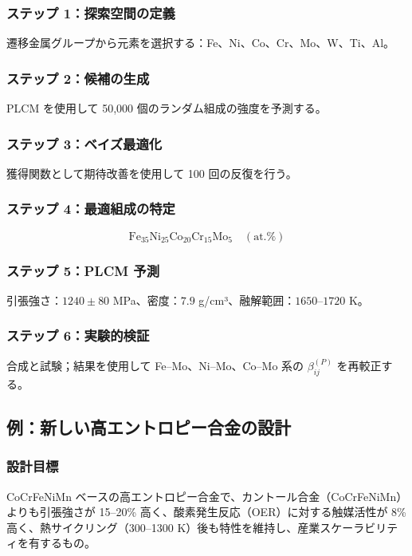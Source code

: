 \documentclass[11pt,a4paper]{article}
\theoremstyle{remark}
\begin{document}
	\subsubsection{ステップ 1：探索空間の定義}
	遷移金属グループから元素を選択する：Fe、Ni、Co、Cr、Mo、W、Ti、Al。
	
	\subsubsection{ステップ 2：候補の生成}
	PLCM を使用して 50,000 個のランダム組成の強度を予測する。
	
	\subsubsection{ステップ 3：ベイズ最適化}
	獲得関数として期待改善を使用して 100 回の反復を行う。
	
	\subsubsection{ステップ 4：最適組成の特定}
	\[
	\text{Fe}_{35}\text{Ni}_{25}\text{Co}_{20}\text{Cr}_{15}\text{Mo}_{5} \quad (\text{at.}\%)
	\]
	
	\subsubsection{ステップ 5：PLCM 予測}
	引張強さ：\(1240 \pm 80\) MPa、密度：\(7.9\) g/cm³、融解範囲：\(1650\)–\(1720\) K。
	
	\subsubsection{ステップ 6：実験的検証}
	合成と試験；結果を使用して Fe–Mo、Ni–Mo、Co–Mo 系の \(\beta_{ij}^{(P)}\) を再較正する。
	
	\subsection{例：新しい高エントロピー合金の設計}
	
	\subsubsection{設計目標}
	CoCrFeNiMn ベースの高エントロピー合金で、カントール合金（CoCrFeNiMn）よりも引張強さが 15–20\% 高く、酸素発生反応（OER）に対する触媒活性が 8\% 高く、熱サイクリング（300–1300 K）後も特性を維持し、産業スケーラビリティを有するもの。
	
\end{document}
